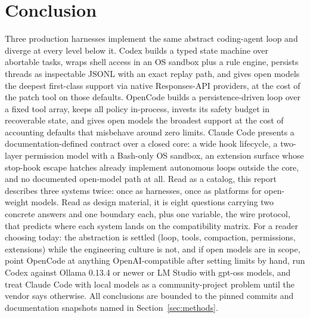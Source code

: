 \documentclass{article}
\newcommand{\codex}[0]{Codex}
\newcommand{\occ}[0]{OpenCode}
\newcommand{\ccc}[0]{Claude Code}
\begin{document}
\section{Conclusion}

Three production harnesses implement the same abstract coding-agent loop
and diverge at every level below it. \codex{} builds a typed state machine
over abortable tasks, wraps shell access in an OS sandbox plus a rule
engine, persists threads as inspectable JSONL with an exact replay path,
and gives open models the deepest first-class support via native
Responses-API providers, at the cost of the patch tool on those defaults.
\occ{} builds a persistence-driven loop over a fixed tool array, keeps all
policy in-process, invests its safety budget in recoverable state, and
gives open models the broadest support at the cost of accounting defaults
that misbehave around zero limits. \ccc{} presents a documentation-defined
contract over a closed core: a wide hook lifecycle, a two-layer
permission model with a Bash-only OS sandbox, an extension surface whose
stop-hook escape hatches already implement autonomous loops outside the
core, and no documented open-model path at all. Read as a catalog, this
report describes three systems twice: once as harnesses, once as
platforms for open-weight models. Read as design material, it is eight
questions carrying two concrete answers and one boundary each, plus one
variable, the wire protocol, that predicts where each system lands on the
compatibility matrix. For a reader choosing today: the abstraction is
settled (loop, tools, compaction, permissions, extensions) while the
engineering culture is not, and if open models are in scope, point
\occ{} at anything OpenAI-compatible after setting limits by hand, run
\codex{} against Ollama 0.13.4 or newer or LM Studio with gpt-oss models,
and treat \ccc{} with local models as a community-project problem until
the vendor says otherwise. All conclusions are bounded to the pinned
commits and documentation snapshots named in Section~\ref{sec:methods}.



\end{document}

